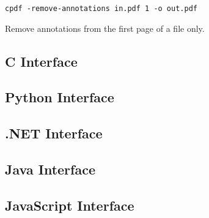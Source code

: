 \documentclass{book}
\begin{document}
  \begin{framed}
    \noindent\small\verb!cpdf -remove-annotations in.pdf 1 -o out.pdf!
    
    \vspace{2.5mm}
    \noindent Remove annotations from the first page of a file only.
  \end{framed}

\pagestyle{empty}\thispagestyle{fancy}

\begin{cpdflib}
\clearpage
\section*{C Interface}
\begin{small}\tt

\end{small}
\end{cpdflib}

\begin{pycpdflib}
\clearpage
\section*{Python Interface}
\begin{small}\tt

\end{small}
\end{pycpdflib}

\begin{dotnetcpdflib}
\clearpage
\section*{.NET Interface}
\begin{small}\tt

\end{small}
\end{dotnetcpdflib}

\begin{jcpdflib}
\clearpage
\section*{Java Interface}
\begin{small}\tt

\end{small}
\end{jcpdflib}

\begin{jscpdflib}
\clearpage
\section*{JavaScript Interface}
\begin{small}\tt

\end{small}
\end{jscpdflib}
\end{document}

